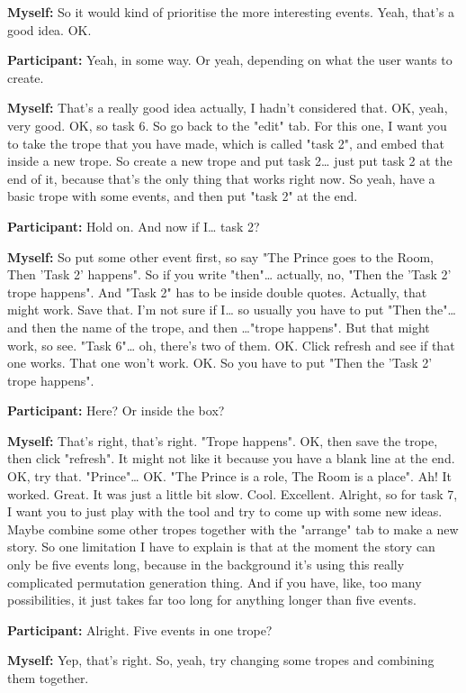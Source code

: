 \documentclass[11pt]{report}
\begin{document}
\begin{linenumbers}
\textbf{Myself:} So it would kind of prioritise the more interesting events. Yeah, that's a good idea. OK.

\textbf{Participant:} Yeah, in some way. Or yeah, depending on what the user wants to create.

\textbf{Myself:} That's a really good idea actually, I hadn't considered that. OK, yeah, very good. OK, so task 6. So go back to the "edit" tab. For this one, I want you to take the trope that you have made, which is called "task 2", and embed that inside a new trope. So create a new trope and put task 2\ldots{} just put task 2 at the end of it, because that's the only thing that works right now. So yeah, have a basic trope with some events, and then put "task 2" at the end.

\textbf{Participant:} Hold on. And now if I\ldots{} task 2?

\textbf{Myself:} So put some other event first, so say "The Prince goes to the Room, Then 'Task 2' happens". So if you write "then"\ldots{} actually, no, "Then the 'Task 2' trope happens". And "Task 2" has to be inside double quotes. Actually, that might work. Save that. I'm not sure if I\ldots{} so usually you have to put "Then the"\ldots{} and then the name of the trope, and then \ldots{}"trope happens". But that might work, so see. "Task 6"\ldots{} oh, there's two of them. OK. Click refresh and see if that one works. That one won't work. OK. So you have to put "Then the 'Task 2' trope happens".

\textbf{Participant:} Here? Or inside the box?

\textbf{Myself:} That's right, that's right. "Trope happens". OK, then save the trope, then click "refresh". It might not like it because you have a blank line at the end. OK, try that. "Prince"\ldots{} OK. "The Prince is a role, The Room is a place". Ah! It worked. Great. It was just a little bit slow. Cool. Excellent. Alright, so for task 7, I want you to just play with the tool and try to come up with some new ideas. Maybe combine some other tropes together with the "arrange" tab to make a new story. So one limitation I have to explain is that at the moment the story can only be five events long, because in the background it's using this really complicated permutation generation thing. And if you have, like, too many possibilities, it just takes far too long for anything longer than five events.

\textbf{Participant:} Alright. Five events in one trope?

\textbf{Myself:} Yep, that's right. So, yeah, try changing some tropes and combining them together.


\end{linenumbers}
\end{document}
